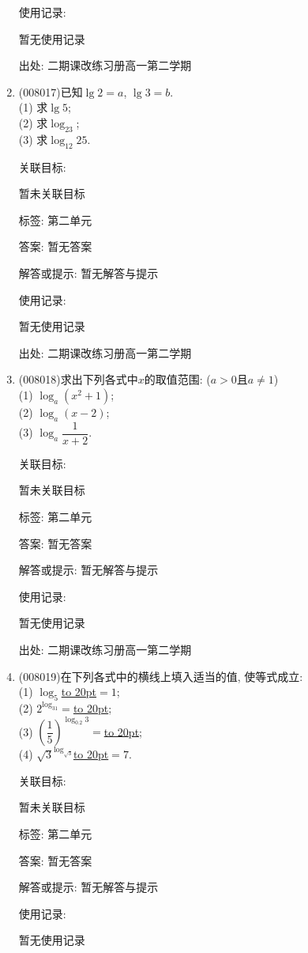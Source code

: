 \documentclass[10pt,a4paper]{article}
\newcommand{\blank}[1]{\underline{\hbox to #1pt{}}}
\begin{document}
\begin{enumerate}[1.]
使用记录:

暂无使用记录


出处: 二期课改练习册高一第二学期
\item { (008017)}已知$\lg 2=a$, $\lg 3=b$.\\
(1) 求$\lg 5$;\\
(2) 求$\log _23$;\\
(3) 求$\log _{12}25$.


关联目标:

暂未关联目标



标签: 第二单元

答案: 暂无答案

解答或提示: 暂无解答与提示

使用记录:

暂无使用记录


出处: 二期课改练习册高一第二学期
\item { (008018)}求出下列各式中$x$的取值范围: ($a>0$且$a\ne 1$)\\
(1) $\log _a(x^2+1)$;\\
(2) $\log _a(x-2)$;\\
(3) $\log _a\dfrac 1{x+2}$.


关联目标:

暂未关联目标



标签: 第二单元

答案: 暂无答案

解答或提示: 暂无解答与提示

使用记录:

暂无使用记录


出处: 二期课改练习册高一第二学期
\item { (008019)}在下列各式中的横线上填入适当的值, 使等式成立:\\
(1) $\log _5$\blank{20}$=1$;\\
(2) $2^{\log _31}=$\blank{20};\\
(3) $(\dfrac 15)^{\log _{0.2}3}=$\blank{20};\\
(4) $\sqrt 3^{\log _{\sqrt 3}}$\blank{20}$=7$.


关联目标:

暂未关联目标



标签: 第二单元

答案: 暂无答案

解答或提示: 暂无解答与提示

使用记录:

暂无使用记录



\end{enumerate}
\end{document}
